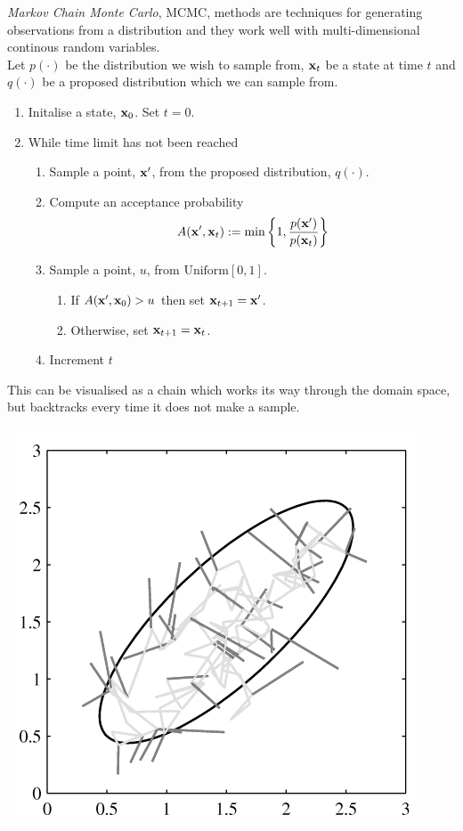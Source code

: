 \documentclass[11pt,a4paper]{article}
\begin{document}
\textit{Markov Chain Monte Carlo}, MCMC, methods are techniques for generating observations from a distribution and they work well with multi-dimensional continous random variables.\\
Let $p(\cdot)$ be the distribution we wish to sample from, $\textbf{x}_t$ be a state at time $t$ and $q(\cdot)$ be a proposed distribution which we can sample from.
\begin{enumerate}
	\item Initalise a state, $\textbf{x}_0$. Set $t=0$.
	\item While time limit has not been reached
	\begin{enumerate}[label=\arabic*)]
		\item Sample a point, $\textbf{x}'$, from the proposed distribution, $q(\cdot)$.
		\item Compute an acceptance probability
		$$A(\textbf{x}',\textbf{x}_t):=\min\left\{1,\frac{p(\textbf{x}')}{p(\textbf{x}_t)}\right\}$$
		\item Sample a point, $u$, from $\text{Uniform}[0,1]$.
		\begin{enumerate}
			\item If $A(\textbf{x}',\textbf{x}_0)>u$ then set $\textbf{x}_{t+1}=\textbf{x}'$.
			\item Otherwise, set $\textbf{x}_{t+1}=\textbf{x}_t$.
		\end{enumerate}	
		\item Increment $t$
	\end{enumerate}
\end{enumerate}
This can be visualised as a chain which works its way through the domain space, but backtracks every time it does not make a sample.
\begin{center}
\includegraphics[scale=.5]{img/mcmc.png}
\end{center}
\end{document}
